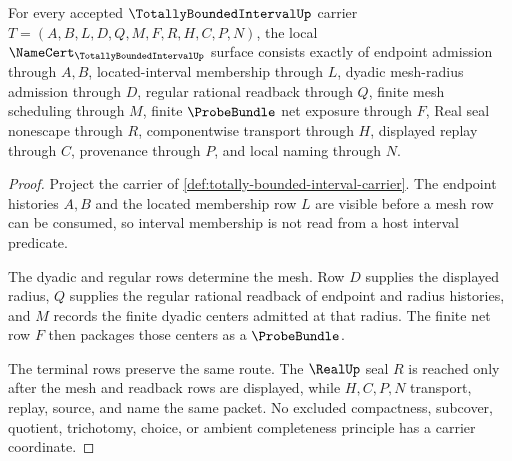 \begin{theorem}
\label{thm:totally-bounded-interval-namecert-obligations}
For every accepted $\TotallyBoundedIntervalUp$ carrier $T=(A,B,L,D,Q,M,F,R,H,C,P,N)$, the local $\NameCert_{\TotallyBoundedIntervalUp}$ surface consists exactly of endpoint admission through $A,B$, located-interval membership through $L$, dyadic mesh-radius admission through $D$, regular rational readback through $Q$, finite mesh scheduling through $M$, finite $\ProbeBundle$ net exposure through $F$, Real seal nonescape through $R$, componentwise transport through $H$, displayed replay through $C$, provenance through $P$, and local naming through $N$.
\end{theorem}
\begin{proof}
Project the carrier of \autoref{def:totally-bounded-interval-carrier}. The endpoint histories $A,B$ and the located membership row $L$ are visible before a mesh row can be consumed, so interval membership is not read from a host interval predicate.

The dyadic and regular rows determine the mesh. Row $D$ supplies the displayed radius, $Q$ supplies the regular rational readback of endpoint and radius histories, and $M$ records the finite dyadic centers admitted at that radius. The finite net row $F$ then packages those centers as a $\ProbeBundle$.

The terminal rows preserve the same route. The $\RealUp$ seal $R$ is reached only after the mesh and readback rows are displayed, while $H,C,P,N$ transport, replay, source, and name the same packet. No excluded compactness, subcover, quotient, trichotomy, choice, or ambient completeness principle has a carrier coordinate.
\end{proof}

